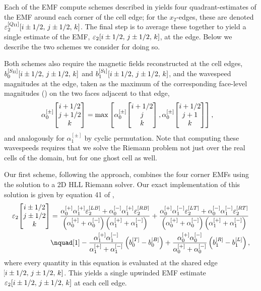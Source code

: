 Each of the EMF compute schemes described in  yields four quadrant-estimates of the EMF around each corner of the cell edge; for the $x_2$-edges, these are denoted $\varepsilon_{2}^{[Q_\mathrm{II}]}\!\left[ i \pm 1/2,\,j \pm 1/2,\,k \right]$. The final step is to average these together to yield a single estimate of the EMF, $\varepsilon_{2}\!\left[ i \pm 1/2,\,j \pm 1/2,\,k \right]$, at the edge. Below we describe the two schemes we consider for doing so.

Both schemes also require the magnetic fields reconstructed at the cell edges, $b_{0}^{[S_\mathrm{II}]}\!\left[ i \pm 1/2,\,j \pm 1/2,\,k \right]$ and $b_{1}^{[S_\mathrm{I}]}\!\left[ i \pm 1/2,\,j \pm 1/2,\,k \right]$, and the wavespeed magnitudes at the edge, taken as the maximum of the corresponding face-level magnitudes () on the two faces adjacent to that edge,
\begin{align}
    \alpha_0^{[\pm]}\!\begin{bmatrix}i + 1/2\\j + 1/2\\k\end{bmatrix}
        &= \max\left[ 
            \alpha_0^{[\pm]}\!\begin{bmatrix}i + 1/2\\j\\k\end{bmatrix},
            \alpha_0^{[\pm]}\!\begin{bmatrix}i + 1/2\\j + 1\\k\end{bmatrix}
         \right]
    , \label{eqn:emf:alpha-edge}
\end{align}
and analogously for $\alpha_1^{[\pm]}$ by cyclic permutation. Note that computing these wavespeeds requires that we solve the Riemann problem not just over the real cells of the domain, but for one ghost cell as well.

Our first scheme, following the \citet[hereafter ]{Londrillo04a} approach, combines the four corner EMFs using the solution to a 2D HLL Riemann solver. Our exact implementation of this solution is given by equation 41 of ,
\begin{align}
    \varepsilon_{2}\EvalAtV{i \pm 1/2}{j \pm 1/2}{k}
        &= \frac{
            \alpha_0^{[+]}\alpha_1^{[+]} \varepsilon_2^{[LB]}
                + \alpha_0^{[-]}\alpha_1^{[+]} \varepsilon_2^{[RB]}
        }{
            \rbrac{\alpha_0^{[+]}+\alpha_0^{[-]}} \rbrac{\alpha_1^{[+]}+\alpha_1^{[-]}}
        }
            + \frac{
                \alpha_0^{[+]}\alpha_1^{[-]} \varepsilon_2^{[LT]}
                + \alpha_0^{[-]}\alpha_1^{[-]} \varepsilon_2^{[RT]}
            }{
                \rbrac{\alpha_0^{[+]}+\alpha_0^{[-]}} \rbrac{\alpha_1^{[+]}+\alpha_1^{[-]}}
            }
        \nonumber \\
        &\nquad[1]
            - \frac{\alpha_1^{[+]}\alpha_1^{[-]}}{\alpha_1^{[+]}+\alpha_1^{[-]}} \rbrac{b_0^{[T]} - b_0^{[B]}}
            + \frac{\alpha_0^{[+]}\alpha_0^{[-]}}{\alpha_0^{[+]}+\alpha_0^{[-]}} \rbrac{b_1^{[R]} - b_1^{[L]}}
    , \label{eqn:emf:ld04}
\end{align}
where every quantity in this equation is evaluated at the shared edge $\!\left[ i \pm 1/2,\,j \pm 1/2,\,k \right]$. This yields a single upwinded EMF estimate $\varepsilon_2\!\left[ i \pm 1/2,\,j \pm 1/2,\,k \right]$ at each cell edge.

